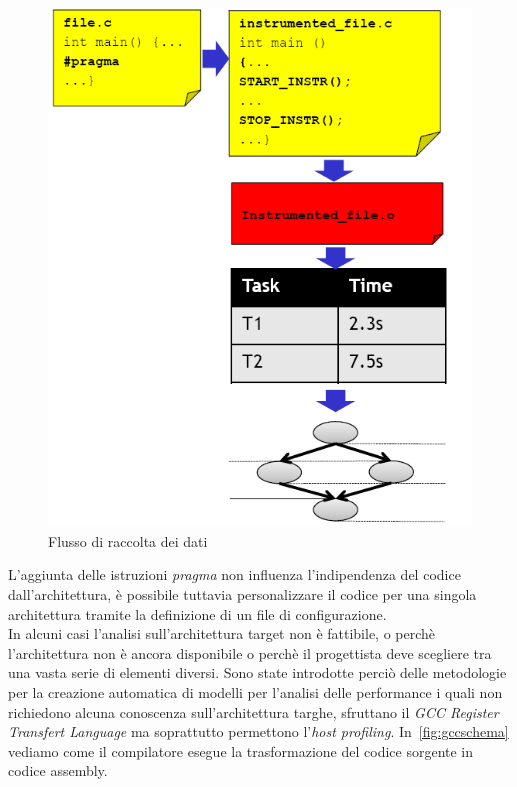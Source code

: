 \begin{figure}
\centering
\includegraphics[scale=0.4]{img/metodoflow.png}
\caption{Flusso di raccolta dei dati}\label{fig:metodoflow}
\end{figure}
L'aggiunta delle istruzioni \emph{pragma} non influenza l'indipendenza del codice dall'architettura, è possibile tuttavia personalizzare il codice per una singola architettura tramite la definizione di un file di configurazione.\\
In alcuni casi l'analisi sull'architettura target non è fattibile, o perchè l'architettura non è ancora disponibile o perchè il progettista deve scegliere tra una vasta serie di elementi diversi. Sono state introdotte perciò delle metodologie per la creazione automatica di modelli per l'analisi delle performance i quali non richiedono alcuna conoscenza sull'architettura targhe, sfruttano il \emph{GCC Register Transfert Language} ma soprattutto permettono l'\emph{host profiling}. In \figurename\,\ref{fig:gccschema} vediamo come il compilatore esegue la trasformazione del codice sorgente in codice assembly.
